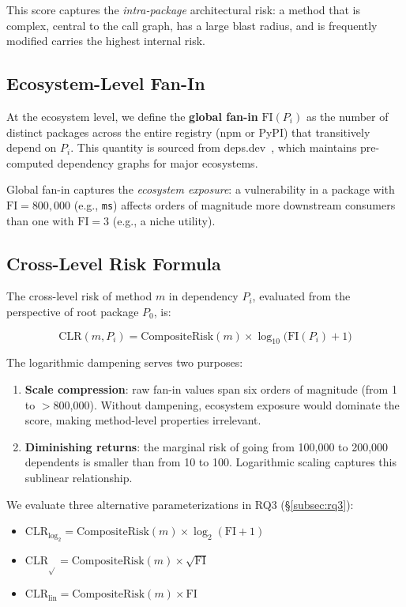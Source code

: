 \documentclass[conference]{IEEEtran}
\begin{document}
This score captures the \emph{intra-package} architectural risk: a method that is complex, central to the call graph, has a large blast radius, and is frequently modified carries the highest internal risk.

\subsection{Ecosystem-Level Fan-In}
\label{subsec:fan-in}

At the ecosystem level, we define the \textbf{global fan-in} $\mathrm{FI}(P_i)$ as the number of distinct packages across the entire registry (npm or PyPI) that transitively depend on $P_i$. This quantity is sourced from deps.dev~\cite{depsdev}, which maintains pre-computed dependency graphs for major ecosystems.

Global fan-in captures the \emph{ecosystem exposure}: a vulnerability in a package with $\mathrm{FI} = 800{,}000$ (e.g., \texttt{ms}) affects orders of magnitude more downstream consumers than one with $\mathrm{FI} = 3$ (e.g., a niche utility).

\subsection{Cross-Level Risk Formula}
\label{subsec:cross-level-formula}

The cross-level risk of method $m$ in dependency $P_i$, evaluated from the perspective of root package $P_0$, is:

\begin{equation}
    \label{eq:cross-level}
    \boxed{\mathrm{CLR}(m, P_i) = \mathrm{CompositeRisk}(m) \times \log_{10}\!\bigl(\mathrm{FI}(P_i) + 1\bigr)}
\end{equation}

The logarithmic dampening serves two purposes:
\begin{enumerate}
    \item \textbf{Scale compression}: raw fan-in values span six orders of magnitude (from 1 to $>$800,000). Without dampening, ecosystem exposure would dominate the score, making method-level properties irrelevant.
    \item \textbf{Diminishing returns}: the marginal risk of going from 100,000 to 200,000 dependents is smaller than from 10 to 100. Logarithmic scaling captures this sublinear relationship.
\end{enumerate}

We evaluate three alternative parameterizations in RQ3 (§\ref{subsec:rq3}):
\begin{itemize}
    \item $\mathrm{CLR}_{\log_2} = \mathrm{CompositeRisk}(m) \times \log_2(\mathrm{FI}+1)$
    \item $\mathrm{CLR}_{\sqrt{}} = \mathrm{CompositeRisk}(m) \times \sqrt{\mathrm{FI}}$
    \item $\mathrm{CLR}_{\mathrm{lin}} = \mathrm{CompositeRisk}(m) \times \mathrm{FI}$
\end{itemize}
\end{document}
